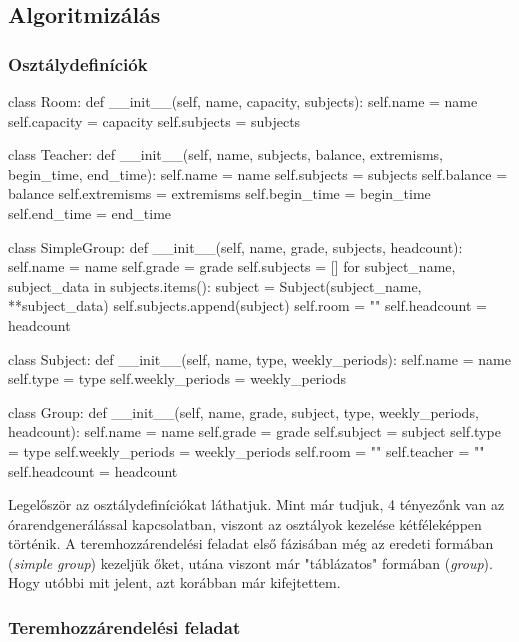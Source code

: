 \documentclass[12pt,a4paper]{report}
\begin{document}
\subsection{Algoritmizálás}

\subsubsection{Osztálydefiníciók}

\begin{python}
class Room:
    def __init__(self, name, capacity, subjects):
        self.name = name
        self.capacity = capacity
        self.subjects = subjects


class Teacher:
    def __init__(self, name, subjects, balance, extremisms, begin_time, end_time):
        self.name = name
        self.subjects = subjects
        self.balance = balance
        self.extremisms = extremisms
        self.begin_time = begin_time
        self.end_time = end_time


class SimpleGroup:
    def __init__(self, name, grade, subjects, headcount):
        self.name = name
        self.grade = grade
        self.subjects = []
        for subject_name, subject_data in subjects.items():
            subject = Subject(subject_name, **subject_data)
            self.subjects.append(subject)
        self.room = ""
        self.headcount = headcount


class Subject:
    def __init__(self, name, type, weekly_periods):
        self.name = name
        self.type = type
        self.weekly_periods = weekly_periods


class Group:
    def __init__(self, name, grade, subject, type, weekly_periods, headcount):
        self.name = name
        self.grade = grade
        self.subject = subject
        self.type = type
        self.weekly_periods = weekly_periods
        self.room = ""
        self.teacher = ""
        self.headcount = headcount
\end{python}

Legelőször az osztálydefiníciókat láthatjuk. Mint már tudjuk, 4 tényezőnk van az órarendgenerálással kapcsolatban, viszont az osztályok kezelése kétféleképpen történik. A teremhozzárendelési feladat első fázisában még az eredeti formában (\textsl{simple group}) kezeljük őket, utána viszont már "táblázatos" formában (\textsl{group}). Hogy utóbbi mit jelent, azt korábban már kifejtettem.

\subsubsection{Teremhozzárendelési feladat}
\end{document}
